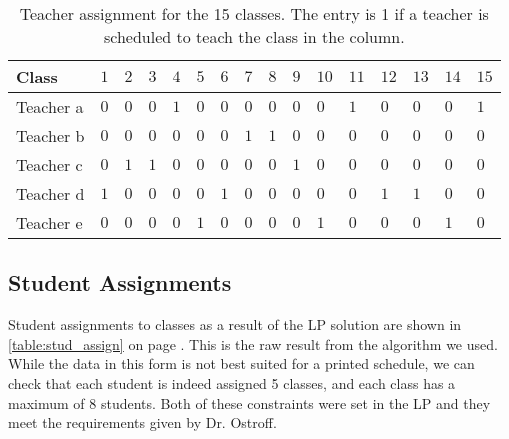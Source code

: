 \documentclass[11pt]{article}
\begin{document}
\begin{table}[h!]
\begin{tabular}{|a||l|l|l|l|l|l|l|l|l|l|l|l|l|l|l|} \hline
{}Class & $1$ & $2$ & $3$ & $4$ & $5$ & $6$ &
$7$ & $8$ & $9$ & $10$ & $11$ & $12$ & $13$ &
$14$ & $15$ \\ \hline \hline
Teacher a & $0$ & $0$ & $0$ & $1$ & $0$ & $0$
& $0$ & $0$ & $0$ & $0$ & $1$ & $0$ & $0$
& $0$ & $1$ \\ \hline
Teacher b & $0$ & $0$ & $0$ & $0$ & $0$ & $0$
& $1$ & $1$ & $0$ & $0$ & $0$ & $0$ & $0$
& $0$ & $0$ \\ \hline
Teacher c & $0$ & $1$ & $1$ & $0$ & $0$ & $0$
& $0$ & $0$ & $1$ & $0$ & $0$ & $0$ & $0$
& $0$ & $0$ \\ \hline
Teacher d & $1$ & $0$ & $0$ & $0$ & $0$ & $1$
& $0$ & $0$ & $0$ & $0$ & $0$ & $1$ & $1$
& $0$ & $0$ \\ \hline
Teacher e & $0$ & $0$ & $0$ & $0$ & $1$ & $0$
& $0$ & $0$ & $0$ & $1$ & $0$ & $0$ & $0$
& $1$ & $0$ \\ \hline
\end{tabular}
\caption{Teacher assignment for the 15 classes. The entry is 1 if a teacher is scheduled to teach the class in the column.}
\label{table:teacher_assign}
\end{table}

\FloatBarrier
\subsection{Student Assignments}
Student assignments to classes as a result of the LP solution are shown in \ref{table:stud_assign} on page \pageref{table:stud_assign}. This is the raw result from the algorithm we used. While the data in this form is not best suited for a printed schedule, we can check that each student is indeed assigned 5 classes, and each class has a maximum of 8 students. Both of these constraints were set in the LP and they meet the requirements given by Dr. Ostroff.
\end{document}
